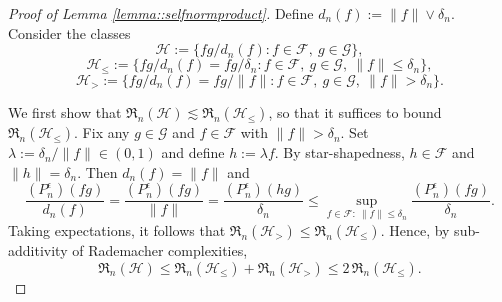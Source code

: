 \documentclass[11pt]{article}
\theoremstyle{plain}
\theoremstyle{definition} %
\begin{document}
 
\begin{proof}[Proof of Lemma \ref{lemma::selfnormproduct}]
    




Define $d_n(f):=\|f\|\vee \delta_n$. Consider the classes
\[
\mathcal{H}:=\{fg/d_n(f): f\in\mathcal{F},\ g\in\mathcal{G}\},
\]
\[
\mathcal{H}_{\le}:=\{fg/d_n(f)=fg/\delta_n: f\in\mathcal{F},\ g\in\mathcal{G},\ \|f\|\le \delta_n\},
\]
\[
\mathcal{H}_{>}:=\{fg/d_n(f)=fg/\|f\|: f\in\mathcal{F},\ g\in\mathcal{G},\ \|f\|> \delta_n\}.
\]


We first show that $\mathfrak{R}_n(\mathcal{H}) \lesssim \mathfrak{R}_n(\mathcal{H}_{\leq})$, so that it suffices to bound $\mathfrak{R}_n(\mathcal{H}_{\le})$.
Fix any $g\in\mathcal{G}$ and $f\in\mathcal{F}$ with $\|f\|>\delta_n$. Set
$\lambda:=\delta_n/\|f\|\in(0,1)$ and define $h:=\lambda f$.
By star-shapedness, $h\in\mathcal{F}$ and $\|h\|=\delta_n$. Then $d_n(f)=\|f\|$ and
\[
\frac{(P_n^\epsilon)(fg)}{d_n(f)}
=
\frac{(P_n^\epsilon)(fg)}{\|f\|}
=
\frac{(P_n^\epsilon)(hg)}{\delta_n}
\le
\sup_{f\in\mathcal{F}:\ \|f\|\le \delta_n}
\frac{(P_n^\epsilon)(fg)}{\delta_n}.
\]
Taking expectations, it follows that $\mathfrak{R}_n(\mathcal{H}_{>})
\le
\mathfrak{R}_n(\mathcal{H}_{\le}).$
Hence, by sub-additivity of Rademacher complexities,
\[
\mathfrak{R}_n(\mathcal{H})
\le
\mathfrak{R}_n(\mathcal{H}_{\le})+\mathfrak{R}_n(\mathcal{H}_{>})
\le
2\,\mathfrak{R}_n(\mathcal{H}_{\le}).
\]




\end{proof}
\end{document}
